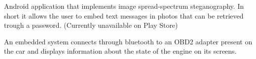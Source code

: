 \documentclass[11 pt,oneside,a4paper,titlepage]{article}
\begin{document}
{\begin{minipage}{11.3cm}
    \vspace*{0.22cm}
    {
        Android application that implements image spread-spectrum steganography. 
        In short it allows the user to embed text messages in photos 
        that can be retrieved trough a password.
        (Currently unavailable on Play Store)
    }

    \vspace*{0.22cm}
    {
        An embedded system connects through bluetooth to an OBD2 adapter present on 
        the car and displays information about the state of the engine on its screens.
    }	
    
    
    
    
    

\end{minipage}}
\end{document}
